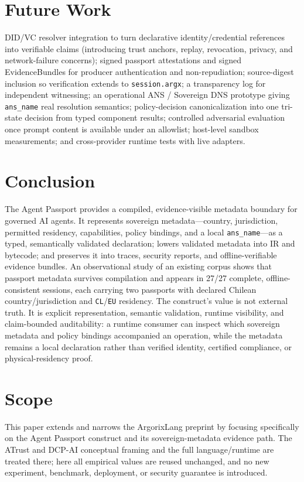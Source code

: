 \documentclass[conference]{IEEEtran}
\newcommand{\code}[1]{\texttt{\small #1}}
\newcommand{\Argorix}{%
\textcolor{argViolet}{A}\textcolor{argViolet}{r}\textcolor{argIndigo}{g}\textcolor{argIndigo}{o}\textcolor{argElectric}{r}\textcolor{argElectric}{i}\textcolor{argElectric}{x}\textcolor{argCyan}{L}\textcolor{argCyan}{a}\textcolor{argCyanBright}{n}\textcolor{argCyanBright}{g}\xspace}
\begin{document}
\section{Future Work}\label{sec:future}
DID/VC resolver integration to turn declarative identity/credential references
into verifiable claims (introducing trust anchors, replay, revocation, privacy,
and network-failure concerns); signed passport attestations and signed
EvidenceBundles for producer authentication and non-repudiation; source-digest
inclusion so verification extends to \code{session.argx}; a transparency log for
independent witnessing; an operational ANS / Sovereign DNS prototype giving
\code{ans\_name} real resolution semantics; policy-decision canonicalization into
one tri-state decision from typed component results; controlled adversarial
evaluation once prompt content is available under an allowlist; host-level
sandbox measurements; and cross-provider runtime tests with live adapters.

\section{Conclusion}\label{sec:conclusion}
The Agent Passport provides a compiled, evidence-visible metadata boundary for
governed AI agents. It represents sovereign metadata---country, jurisdiction,
permitted residency, capabilities, policy bindings, and a local
\code{ans\_name}---as a typed, semantically validated declaration; lowers
validated metadata into IR and bytecode; and preserves it into traces, security
reports, and offline-verifiable evidence bundles. An observational study of an
existing corpus shows that passport metadata survives compilation and appears in
27/27 complete, offline-consistent sessions, each carrying two passports with
declared Chilean country/jurisdiction and \code{CL}/\code{EU} residency. The
construct's value is not external truth. It is explicit representation, semantic
validation, runtime visibility, and claim-bounded auditability: a runtime
consumer can inspect which sovereign metadata and policy bindings accompanied an
operation, while the metadata remains a local declaration rather than verified
identity, certified compliance, or physical-residency proof.

\section{Scope}\label{sec:diff}
This paper extends and narrows the \Argorix preprint
\cite{venegas2026argorixlang} by focusing specifically on the Agent Passport
construct and its sovereign-metadata evidence path. The ATrust and DCP-AI
conceptual framing \cite{vazquez_atrust,naranjo_dcpai} and the full
language/runtime are treated there; here all empirical values are reused
unchanged, and no new experiment, benchmark, deployment, or security guarantee is
introduced.



\end{document}
